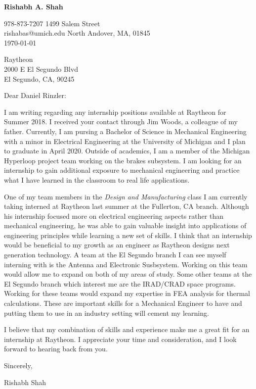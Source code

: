 \documentclass[11pt]{article}
\begin{document}

\begin{center}
{\large\noindent\textbf{Rishabh A. Shah}}
\end{center}

978-873-7207 \hfill 1499 Salem Street\\
rishabas@umich.edu \hfill North Andover, MA, 01845\\

\today

Raytheon\\
2000 E El Segundo Blvd\\
El Segundo, CA, 90245

Dear Daniel Rinzler:

I am writing regarding any internship positions available at Raytheon for Summer 2018. I received your contact through Jim Woods, a colleague of my father. Currently, I am pursing a Bachelor of Science in Mechanical Engineering with a minor in Electrical Engineering at the University of Michigan and I plan to graduate in April 2020. Outside of academics, I am a member of the Michigan Hyperloop project team working on the brakes subsystem. I am looking for an internship to gain additional exposure to mechanical engineering and practice what I have learned in the classroom to real life applications.

One of my team members in the \textit{Design and Manufacturing} class I am currently taking interned at Raytheon last summer at the Fullerton, CA branch. Although his internship focused more on electrical engineering aspects rather than mechanical engineering, he was able to gain valuable insight into applications of engineering principles while learning a new set of skills. I think that an internship would be beneficial to my growth as an engineer as Raytheon designs next generation technology. A team at the El Segundo branch I can see myself interning with is the Antenna and Electronic Susbsystem. Working on this team would allow me to expand on both of my areas of study. Some other teams at the El Segundo branch which interest me are the IRAD/CRAD space programs. Working for these teams would expand my expertise in FEA analysis for thermal calculations. These are important skills for a Mechanical Engineer to have and putting them to use in an industry setting will cement my learning.

I believe that my combination of skills and experience make me a great fit for an internship at Raytheon. I appreciate your time and consideration, and I look forward to hearing back from you.

\vfill
Sincerely,

\vspace{3em}

Rishabh Shah
\end{document}
